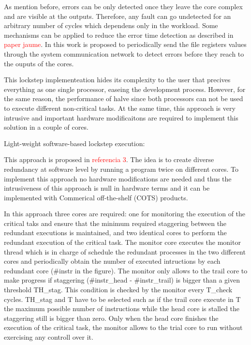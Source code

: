 As mention before, errors can be only detected once they leave the core complex and are visible at the outputs. Therefore, any fault can go undetected for an arbitrary number of cycles which dependens only in the workload. Some mechanisms can be applied to reduce the error time detection as described in \textcolor{red}{paper jaume}. In this work is proposed to periodically send the file registers values through the system communication network to detect errors before they reach to the ouputs of the cores.

This lockstep implementeation hides its complexity to the user that precives everything as one single processor, easeing the development process. However, for the same reason, the performance of halve since both processors can not be used to execute different non-critical tasks. At the same time, this approach is very intrusive and important hardware modificaitons are required to implement this solution in a couple of cores.

Light-weight software-based lockstep execution: 

This approach is proposed in \textcolor{red}{referencia 3}. The idea is to create diverse redundancy at software level by running a program twice on different cores. To implement this approach no hardware modifications are needed and thus the intrusiveness of this approach is null in hardware terms and it can be implemented with Commerical off-the-shelf (COTS) products.

In this approach three cores are required: one for monitoring the execution of the critical taks and ensure that the minimum required staggering between the redundant executions is maintained, and two identical cores to perform the redundant execution of the critical task. The monitor core executes the monitor thread which is in charge of schedule the redundant processes in the two different cores and periodically obtain the number of executed intructions by each redundant core (\#instr in the figure). The monitor only allows to the trail core to make progress if staggering (\#instr\_head - \#instr\_trail) is bigger than a given threshold TH\_stag. This condition is checked by the monitor every T\_check cycles. TH\_stag and T have to be selected such as if the trail core execute in T the maximum possible number of instructions while the head core is stalled the staggering still is bigger than zero. Only when the head core finishes the execution of the critical task, the monitor allows to the trial core to run without exercising any controll over it. 


